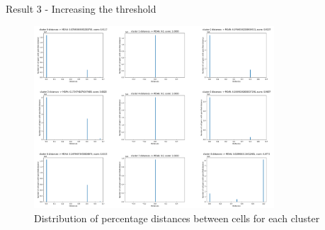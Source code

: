 \documentclass{beamer}
\begin{document}
\begin{frame}{Result 3 - Increasing the threshold}

\begin{figure}
    \centering
    \includegraphics[width=0.8\textwidth]{stats_clusters6.png}
    \caption{Distribution of percentage distances between cells for each cluster}
\end{figure} 

\end{frame}
\end{document}
